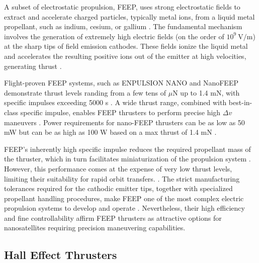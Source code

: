 A subset of electrostatic propulsion, \ac{FEEP}, uses strong electrostatic fields to extract and accelerate charged particles, typically metal ions, from a liquid metal propellant, such as indium, cesium, or gallium \cite{feep-plasma-propulsion}. The fundamental mechanism involves the generation of extremely high electric fields (on the order of $10^9~\mathrm{V/m}$) at the sharp tips of field emission cathodes. These fields ionize the liquid metal and accelerates the resulting positive ions out of the emitter at high velocities, generating thrust \cite{feep-general-tip-design}\cite{feep-ion-emitter-study}. 

Flight-proven \ac{FEEP} systems, such as ENPULSION NANO and NanoFEEP \cite{tajmar-feep} demonstrate thrust levels randing from a few tens of $\mu$N up to 1.4 mN, with specific impulses exceeding 5000 s \cite{marcuccio-feep}\cite{tajmar-feep}\cite{alnaqbi-propulsion_summary}. A wide thrust range, combined with best-in-class specific impulse, enables \ac{FEEP} thrusters to perform precise high $\Delta v$ maneuvers \cite{levchenko-propulsion_summary}\cite{alnaqbi-propulsion_summary}. Power requirements for nano-FEEP thrusters can be as low as 50 mW but can be as high as 100 W based on a max thrust of 1.4 mN \cite{alnaqbi-propulsion_summary}. 

\ac{FEEP}’s inherently high specific impulse reduces the required propellant mass of the thruster, which in turn facilitates miniaturization of the propulsion system \cite{lozano-smallspacecraft_summary}. However, this performance comes at the expense of very low thrust levels, limiting their suitability for rapid orbit transfers. \cite{lozano-smallspacecraft_summary}\cite{alnaqbi-propulsion_summary}. The strict manufacturing tolerances required for the cathodic emitter tips, together with specialized propellant handling procedures, make \ac{FEEP} one of the most complex electric propulsion systems to develop and operate \cite{alnaqbi-propulsion_summary}. Nevertheless, their high efficiency and fine controllability affirm \ac{FEEP} thrusters as attractive options for nanosatellites requiring precision maneuvering capabilities.


\subsection{Hall Effect Thrusters}

